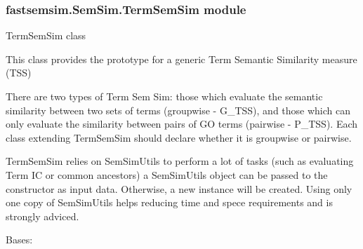 \documentclass[letterpaper,10pt,english]{sphinxmanual}
\begin{document}
\subsubsection{fastsemsim.SemSim.TermSemSim module}
\label{fastsemsim.SemSim:module-fastsemsim.SemSim.TermSemSim}\label{fastsemsim.SemSim:fastsemsim-semsim-termsemsim-module}
TermSemSim class

This class provides the prototype for a generic Term Semantic Similarity measure (TSS)

There are two types of Term Sem Sim: those which evaluate the semantic similarity between two sets of terms (groupwise - G\_TSS), and those which can only evaluate the similarity between pairs of GO terms (pairwise - P\_TSS). Each class extending TermSemSim should declare whether it is groupwise or pairwise.

TermSemSim relies on SemSimUtils to perform a lot of tasks (such as evaluating Term IC or common ancestors)
a SemSimUtils object can be passed to the constructor as input data. Otherwise, a new instance will be created. Using only one copy of SemSimUtils helps reducing time and spece requirements and is strongly adviced.

\begin{fulllineitems}
\label{fastsemsim.SemSim:fastsemsim.SemSim.TermSemSim.MissingAcException}
Bases: 

\end{fulllineitems}

\end{document}
